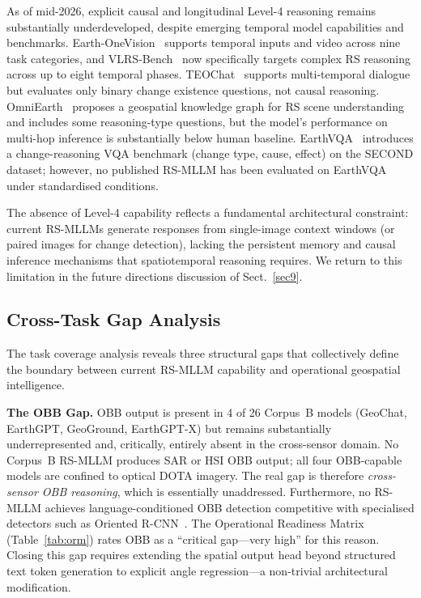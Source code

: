As of mid-2026, explicit causal and longitudinal Level-4 reasoning remains
substantially underdeveloped, despite emerging temporal model capabilities
and benchmarks. Earth-OneVision~\cite{earthonevision2026} supports temporal
inputs and video across nine task categories, and VLRS-Bench~\cite{vlrsbench2026}
now specifically targets complex RS reasoning across up to eight temporal phases.
TEOChat~\cite{teochat2025} supports multi-temporal dialogue but
evaluates only binary change existence questions, not causal reasoning.
OmniEarth~\cite{omniearth2026} proposes a geospatial knowledge graph for
RS scene understanding and includes some reasoning-type questions, but the
model's performance on multi-hop inference is substantially below human
baseline. EarthVQA~\cite{earthvqa2024} introduces a change-reasoning VQA
benchmark (change type, cause, effect) on the SECOND dataset; however, no
published RS-MLLM has been evaluated on EarthVQA under standardised conditions.

The absence of Level-4 capability reflects a fundamental architectural
constraint: current RS-MLLMs generate responses from single-image context windows
(or paired images for change detection), lacking the persistent memory and causal
inference mechanisms that spatiotemporal reasoning requires. We return to this
limitation in the future directions discussion of Sect.~\ref{sec9}.

\subsection{Cross-Task Gap Analysis}\label{sec4:gaps}

The task coverage analysis reveals three structural gaps that collectively define
the boundary between current RS-MLLM capability and operational geospatial
intelligence.

\textbf{The OBB Gap.} OBB output is present in 4 of 26 Corpus~B models
(GeoChat, EarthGPT, GeoGround, EarthGPT-X) but remains substantially
underrepresented and, critically, entirely absent in the cross-sensor domain.
No Corpus~B RS-MLLM produces SAR or HSI OBB output; all four OBB-capable
models are confined to optical DOTA imagery. The real gap is therefore
\emph{cross-sensor OBB reasoning}, which is essentially unaddressed.
Furthermore, no RS-MLLM achieves language-conditioned OBB detection competitive
with specialised detectors such as Oriented R-CNN~\cite{xie2021orientedrcnn}.
The Operational Readiness Matrix (Table~\ref{tab:orm}) rates OBB as a
``critical gap---very high'' for this reason. Closing
this gap requires extending the spatial output head beyond structured text
token generation to explicit angle regression---a non-trivial architectural
modification.

